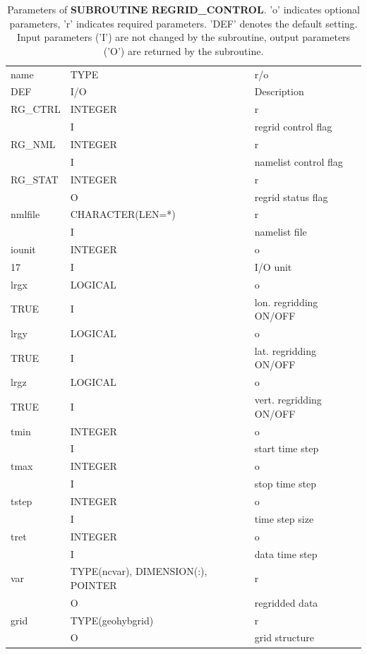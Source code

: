 \documentclass[12pt, a4paper]{article}
\begin{document}
\begin{table}
 \centering
\begin{tabular}{|l|l||l|}
\hline
name    & TYPE                              & r/o\\
DEF     & I/O                               & Description\\
\hline
\hline
RG\_CTRL& INTEGER                           & r\\
        & I  & regrid control flag\\
\hline
RG\_NML & INTEGER                           & r\\
        & I  & namelist control flag\\
\hline
RG\_STAT& INTEGER                           & r\\
        & O & regrid status flag\\
\hline
nmlfile & CHARACTER(LEN=*)                  & r\\
        & I   & namelist file\\
\hline
iounit  & INTEGER                           & o\\
     17 & I   & I/O unit\\
\hline
lrgx    & LOGICAL                           & o\\
    TRUE& I   & lon. regridding ON/OFF\\
\hline
lrgy    & LOGICAL                           & o\\
    TRUE& I   & lat. regridding ON/OFF\\
\hline
lrgz    & LOGICAL                           & o\\
    TRUE& I   & vert. regridding ON/OFF\\
\hline
tmin    & INTEGER                           & o\\
        & I   & start time step\\
\hline
tmax    & INTEGER                           & o\\
        & I   & stop time step\\
\hline
tstep   & INTEGER                           & o\\
        & I   & time step size\\
\hline
tret    & INTEGER                           & o\\
        & I   & data time step\\
\hline
var     & TYPE(ncvar), DIMENSION(:), POINTER & r\\
        & O   & regridded data\\
\hline
grid    & TYPE(geohybgrid)          & r\\
        & O   & grid structure\\
\hline
\hline
\end{tabular}
\caption{Parameters of {\bf SUBROUTINE REGRID\_CONTROL}.
'o' indicates optional parameters, 'r' indicates required
parameters. 'DEF' denotes the default setting.
Input parameters ('I') are not changed by the subroutine,
output parameters ('O') are returned by the subroutine.
}
\label{tab:param}
\end{table}
\end{document}
